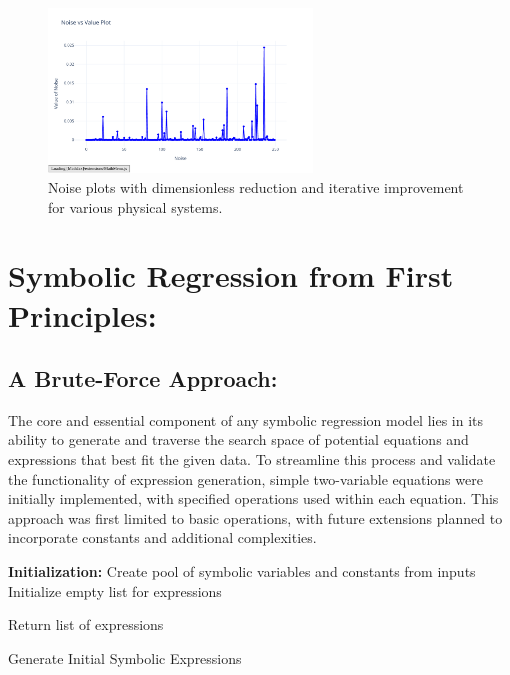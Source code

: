 \documentclass{article}
\begin{document}
\begin{figure}[H]
    \includegraphics[width=7cm]{noise_Simple_Harmonic_Motion_d_i}
    \caption{Noise plots with dimensionless reduction and iterative improvement for various physical systems.}
    \label{fig:noise_dimless_iterative_plots}
\end{figure}





\section{Symbolic Regression from First Principles: }


\subsection{A Brute-Force Approach: }

The core and essential component of any symbolic regression model lies in its ability to generate and traverse the search space of potential equations and expressions that best fit the given data. To streamline this process and validate the functionality of expression generation, simple two-variable equations were initially implemented, with specified operations used within each equation. This approach was first limited to basic operations, with future extensions planned to incorporate constants and additional complexities.\\



\begin{algorithm}[H]
\SetAlgoLined
{}

\textbf{Initialization:}\;
Create pool of symbolic variables and constants from inputs\;
Initialize empty list for expressions\;


Return list of expressions\;

\caption{Generate Initial Symbolic Expressions}
\label{alg:generate_expressions} %
\end{algorithm}\\
\end{document}
